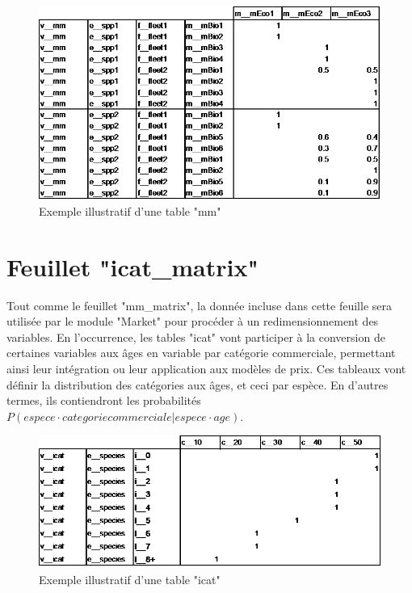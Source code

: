 \documentclass[12pt, colorinlistoftodos, notitlepage]{report}
\newenvironment{not used}[1]{%
    \longtable{%
        |>{\centering$\displaystyle}A{#1}{1}<{$}%
        |}\hline\ignorespaces}{%
    \endlongtable\ignorespacesafterend}
\begin{document}
\begin{figure}[h!]
    \begin{center}
    \includegraphics[width = \textwidth]{figures/param/stock10.png}
    \end{center}
    \caption{Exemple illustratif d'une table "mm"}
    \label{fig:mm}
\end{figure}


\section{Feuillet "icat\_matrix"}

Tout comme le feuillet "mm\_matrix", la donnée incluse dans cette feuille sera utilisée par le module "Market" pour procéder à un redimensionnement des variables. En l'occurrence, les tables "icat" vont participer à la conversion de certaines variables aux âges en variable par catégorie commerciale, permettant ainsi leur intégration ou leur application aux modèles de prix. Ces tableaux vont définir la distribution des catégories aux âges, et ceci par espèce. En d'autres termes, ils contiendront les probabilités $P(espece \cdot categorie commerciale| espece \cdot age)$. 

\begin{figure}[h!]
    \begin{center}
    \includegraphics[width = \textwidth]{figures/param/stock11.png}
    \end{center}
    \caption{Exemple illustratif d'une table "icat"}
    \label{fig:icat}
\end{figure}
\end{document}
